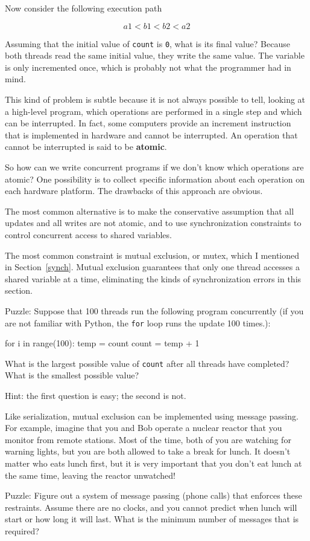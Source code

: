 Now consider the following execution path 

\[  a1 < b1 < b2 < a2  \]

Assuming that the
initial value of {\tt count} is {\tt 0},
what is its final value?  Because
both threads read the same initial value, they write
the same value.  The variable is only incremented once, which
is probably not what the programmer had in mind.

This kind of problem is subtle because it is not always possible to
tell, looking at a high-level program, which operations are
performed in a single step and which can be interrupted.
In fact, some computers provide an increment instruction that
is implemented in hardware and cannot be interrupted.
An operation that cannot be interrupted is said to be
{\bf atomic}.

So how can we write concurrent programs if we don't know which
operations are atomic?  One possibility is to collect specific
information about each operation on each hardware platform.
The drawbacks of this approach are obvious.

The most common alternative is to make the conservative
assumption that all updates and all writes are not atomic,
and to use synchronization constraints to control concurrent
access to shared variables.

The most common constraint is mutual exclusion, or mutex,
which I mentioned in Section~\ref{synch}.  Mutual exclusion guarantees
that only one thread accesses a shared variable at a time,
eliminating the kinds of synchronization errors in this section.

Puzzle: Suppose that 100 threads run the following program concurrently
(if you are not familiar with Python, the {\tt for} loop runs the update
100 times.):

\begin{lstbox}{}
for i in range(100):
    temp = count
    count = temp + 1
\end{lstbox}

What is the largest possible value of {\tt count} after all threads
have completed?  What is the smallest possible value?

Hint: the first question is easy; the second is not.


Like serialization, mutual exclusion
can be implemented using message passing.  For example, imagine that
you and Bob operate a nuclear reactor that you monitor from remote
stations.  Most of the time, both of you are watching for warning
lights, but you are both allowed to take a break for lunch.  It
doesn't matter who eats lunch first, but it is very important that
you don't eat lunch at the same time, leaving the reactor unwatched!

Puzzle: Figure out a system of message passing (phone calls) that
enforces these restraints.  Assume there are no clocks, and you
cannot predict when lunch will start or how long it will last.  What
is the minimum number of messages that is required?

